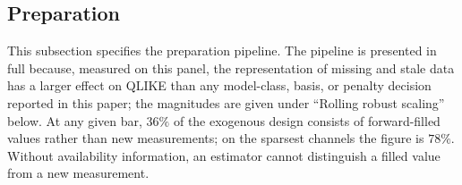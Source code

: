 \subsection{Preparation}
\label{sec:dp_prep}

This subsection specifies the preparation pipeline. The pipeline is
presented in full because, measured on this panel, the representation of
missing and stale data has a larger effect on QLIKE than any model-class,
basis, or penalty decision reported in this paper; the magnitudes are given
under ``Rolling robust scaling'' below. At any given bar, $36\%$ of the
exogenous design consists of forward-filled values rather than new
measurements; on the sparsest channels the figure is $78\%$. Without
availability information, an estimator cannot distinguish a filled value
from a new measurement.

